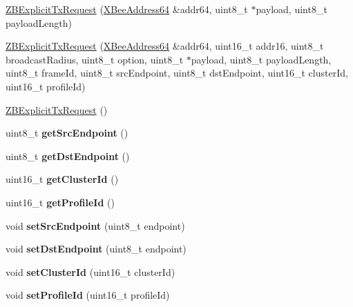 \begin{DoxyCompactItemize}
\item 
\hyperlink{class_z_b_explicit_tx_request_af3070c2fb34934aa3c4cdeb3d0c96429}{Z\+B\+Explicit\+Tx\+Request} (\hyperlink{class_x_bee_address64}{X\+Bee\+Address64} \&addr64, uint8\+\_\+t $\ast$payload, uint8\+\_\+t payload\+Length)
\item 
\hyperlink{class_z_b_explicit_tx_request_ab7c5910a9655e897cf4534091f368e17}{Z\+B\+Explicit\+Tx\+Request} (\hyperlink{class_x_bee_address64}{X\+Bee\+Address64} \&addr64, uint16\+\_\+t addr16, uint8\+\_\+t broadcast\+Radius, uint8\+\_\+t option, uint8\+\_\+t $\ast$payload, uint8\+\_\+t payload\+Length, uint8\+\_\+t frame\+Id, uint8\+\_\+t src\+Endpoint, uint8\+\_\+t dst\+Endpoint, uint16\+\_\+t cluster\+Id, uint16\+\_\+t profile\+Id)
\item 
\hyperlink{class_z_b_explicit_tx_request_a5bcc41ae8c0506c80a0b670e6f032f2a}{Z\+B\+Explicit\+Tx\+Request} ()
\item 
\hypertarget{class_z_b_explicit_tx_request_a1e79a2687c7c1a4daed9a943c3ebdb28}{}\label{class_z_b_explicit_tx_request_a1e79a2687c7c1a4daed9a943c3ebdb28} 
uint8\+\_\+t {\bfseries get\+Src\+Endpoint} ()
\item 
\hypertarget{class_z_b_explicit_tx_request_a58c0045b003cc0f2dd0ecc08cfe13f40}{}\label{class_z_b_explicit_tx_request_a58c0045b003cc0f2dd0ecc08cfe13f40} 
uint8\+\_\+t {\bfseries get\+Dst\+Endpoint} ()
\item 
\hypertarget{class_z_b_explicit_tx_request_a385d5ffebbaf09ddc1f6d6469dac7dd4}{}\label{class_z_b_explicit_tx_request_a385d5ffebbaf09ddc1f6d6469dac7dd4} 
uint16\+\_\+t {\bfseries get\+Cluster\+Id} ()
\item 
\hypertarget{class_z_b_explicit_tx_request_aaf86a4b561d355999258e71f6cf70f61}{}\label{class_z_b_explicit_tx_request_aaf86a4b561d355999258e71f6cf70f61} 
uint16\+\_\+t {\bfseries get\+Profile\+Id} ()
\item 
\hypertarget{class_z_b_explicit_tx_request_ab276c6344b8db881a382f732a981f028}{}\label{class_z_b_explicit_tx_request_ab276c6344b8db881a382f732a981f028} 
void {\bfseries set\+Src\+Endpoint} (uint8\+\_\+t endpoint)
\item 
\hypertarget{class_z_b_explicit_tx_request_ab14b61df0eedb2983972d0a88d58dfa7}{}\label{class_z_b_explicit_tx_request_ab14b61df0eedb2983972d0a88d58dfa7} 
void {\bfseries set\+Dst\+Endpoint} (uint8\+\_\+t endpoint)
\item 
\hypertarget{class_z_b_explicit_tx_request_ac0e96227a092df7d167bd2c58cf614dc}{}\label{class_z_b_explicit_tx_request_ac0e96227a092df7d167bd2c58cf614dc} 
void {\bfseries set\+Cluster\+Id} (uint16\+\_\+t cluster\+Id)
\item 
\hypertarget{class_z_b_explicit_tx_request_afa6ab48faa13a7e5a7bbd41982200bfb}{}\label{class_z_b_explicit_tx_request_afa6ab48faa13a7e5a7bbd41982200bfb} 
void {\bfseries set\+Profile\+Id} (uint16\+\_\+t profile\+Id)
\end{DoxyCompactItemize}
